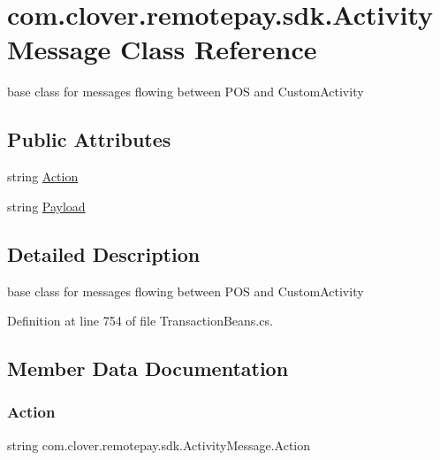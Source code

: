 \hypertarget{classcom_1_1clover_1_1remotepay_1_1sdk_1_1_activity_message}{}\section{com.\+clover.\+remotepay.\+sdk.\+Activity\+Message Class Reference}
\label{classcom_1_1clover_1_1remotepay_1_1sdk_1_1_activity_message}


base class for messages flowing between P\+OS and Custom\+Activity  


\subsection*{Public Attributes}
\begin{DoxyCompactItemize}
\item 
string \hyperlink{classcom_1_1clover_1_1remotepay_1_1sdk_1_1_activity_message_a1ad0c129d12c2e98d111465bc3ee29e4}{Action}
\item 
string \hyperlink{classcom_1_1clover_1_1remotepay_1_1sdk_1_1_activity_message_a986e24b00f597aa74e0dcf8b25e42338}{Payload}
\end{DoxyCompactItemize}


\subsection{Detailed Description}
base class for messages flowing between P\+OS and Custom\+Activity 



Definition at line 754 of file Transaction\+Beans.\+cs.



\subsection{Member Data Documentation}
\mbox{\label{classcom_1_1clover_1_1remotepay_1_1sdk_1_1_activity_message_a1ad0c129d12c2e98d111465bc3ee29e4}} 
\subsubsection{\texorpdfstring{Action}{Action}}
{\footnotesize\ttfamily string com.\+clover.\+remotepay.\+sdk.\+Activity\+Message.\+Action}



